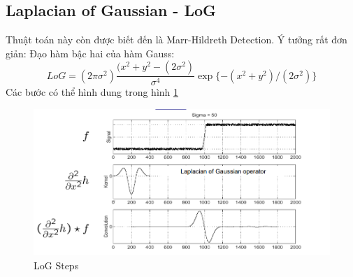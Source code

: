 \documentclass{article}
\begin{document}
\subsection{Laplacian of Gaussian - LoG}
\label{n3}
Thuật toán này còn được biết đến là Marr-Hildreth Detection.
Ý tưởng rất đơn giản: Đạo hàm bậc hai của hàm Gauss:
$$LoG = (2\pi \sigma^{2})\frac{(x^{2}+y^{2}-(2\sigma^{2})}{\sigma^{4}} \exp\{-(x^{2}+y^{2})/(2\sigma^{2})\}$$
Các bước có thể hình dung trong hình \ref{fig7}
\begin{figure}[ht!]
    \centering
    \includegraphics[width = 0.9\linewidth]{fig7.png}
    \caption{LoG Steps}
    \label{fig7}
\end{figure}
\end{document}
